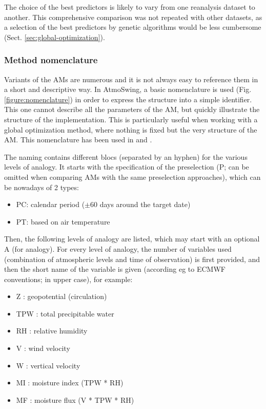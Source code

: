 \documentclass[review]{elsarticle}
\begin{document}
The choice of the best predictors is likely to vary from one reanalysis dataset to another. This comprehensive comparison was not repeated with other datasets, as a selection of the best predictors by genetic algorithms would be less cumbersome (Sect. \ref{sec:global-optimization}).


\subsubsection{Method nomenclature}

Variants of the AMs are numerous and it is not always easy to reference them in a short and descriptive way. In AtmoSwing, a basic nomenclature is used (Fig. \ref{figure:nomenclature}) in order to express the structure into a simple identifier. This one cannot describe all the parameters of the AM, but quickly illustrate the structure of the implementation. This is particularly useful when working with a global optimization method, where nothing is fixed but the very structure of the AM. This nomenclature has been used in \citet{Horton2017a, Horton2017b, Horton2018a} and \citet{Horton2018b}.

The naming contains different blocs (separated by an hyphen) for the various levels of analogy. It starts with the specification of the preselection (P; can be omitted when comparing AMs with the same preselection approaches), which can be nowadays of 2 types:
\begin{itemize}
	\item PC: calendar period ($\pm 60$ days around the target date)
	\item PT: based on air temperature \citep{BenDaoud2010}
\end{itemize}

Then, the following levels of analogy are listed, which may start with an optional A (for analogy). For every level of analogy, the number of variables used (combination of atmospheric levels and time of observation) is first provided, and then the short name of the variable is given (according eg to ECMWF conventions; in upper case), for example:
\begin{itemize}
	\item Z : geopotential (circulation)
	\item TPW : total precipitable water
	\item RH : relative humidity
	\item V : wind velocity
	\item W : vertical velocity
	\item MI : moisture index (TPW * RH)
	\item MF : moisture flux (V * TPW * RH)
\end{itemize}
\end{document}
